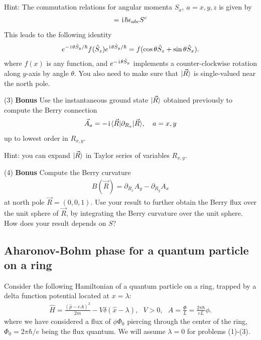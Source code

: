 Hint: 
The commutation relations for angular momenta $\hat S_a,~a=x,y,z$ is given by
\begin{align}
[S^a,S^b]=\imth\hbar\epsilon_{abc}S^c
\end{align}
This leads to the following identity
\begin{align}
e^{-\hspace{1pt}\mathrm{i}\hspace{1pt}\theta\hat S_y/\hbar}f(\hat S_z)e^{\hspace{1pt}\mathrm{i}\hspace{1pt}\theta\hat S_y/\hbar}=f(\cos\theta\hat S_z+\sin\theta\hat S_x).
\end{align}
where $f(x)$ is any function, and $e^{-\hspace{1pt}\mathrm{i}\hspace{1pt}\theta\hat S_y}$ implements a counter-clockwise rotation along $y$-axis by angle $\theta$. You also need to make sure that $|{\vec R}\rangle$ is single-valued near the north pole. 

(3) \textbf{Bonus} Use the instantaneous ground state $|{\vec R}\rangle$ obtained previously to compute the Berry connection
\begin{align}
\vec A_{a}=-\hspace{1pt}\mathrm{i}\hspace{1pt}\langle{\vec R|\partial_{R_{a}}|\vec R}\rangle,~~~a=x,y
\end{align}
up to lowest order in $R_{x,y}$. 

Hint: you can expand $|{\vec R}\rangle$ in Taylor series of variables $R_{x,y}$. 

(4) \textbf{Bonus} Compute the Berry curvature 
\begin{align}
B(\vec R)=\partial_{R_x}A_y-\partial_{R_y}A_x
\end{align}
at north pole $\vec R=(0,0,1)$. Use your result to further obtain the Berry flux over the unit sphere of $\vec R$, by integrating the Berry curvature over the unit sphere. How does your result depends on $S$?

\subsection{Aharonov-Bohm phase for a quantum particle on a ring}

Consider the following Hamiltonian of a quantum particle on a ring, trapped by a delta function potential located at $x=\lambda$:
\begin{align}\label{hw11:particle on a ring}
\hat H=\frac{(\hat p-eA)^2}{2m}-V\delta(\hat x-\lambda),~~~V>0,~~~A=\frac{\Phi}{L}=\frac{2\pi\hbar}{eL}\phi.
\end{align}
where we have considered a flux of $\phi\Phi_0$ piercing through the center of the ring, $\Phi_0=2\pi\hbar/e$ being the flux quantum. We will assume $\lambda=0$ for problems (1)-(3). 

